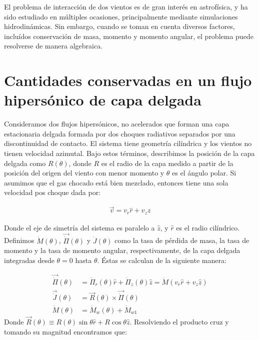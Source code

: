 \label{chap:hipersonica}

El problema de interacción de dos vientos es de gran interés en astrofísica, y
ha sido estudiado en múltiples ocasiones, principalmente mediante simulaciones
hidrodinámicas. Sin embargo, cuando se toman en cuenta diversos factores, incluídos
conservación de masa, momento y momento angular, el problema puede resolverse de manera
algebraica.
\section{Cantidades conservadas en un flujo hipersónico de capa delgada}

Consideramos dos flujos hipersónicos, no acelerados que forman una capa estacionaria delgada
formada por dos choques radiativos separados por una discontinuidad de contacto. El sistema
tiene geometría cilíndrica y los vientos no tienen velocidad azimutal. Bajo estos términos,
describimos la posición de la capa delgada como $R(\theta)$, donde $R$ es el radio de la capa
medido a partir de la posición del origen del viento con menor momento y $\theta$ es el ángulo
polar. Si asumimos que el gas chocado está bien mezclado, entonces tiene una sola velocidad
pos choque dada por:

\begin{align}
  \vec{v} = v_r \hat{r} + v_z \hat{z}
\end{align}

Donde el eje de simetría del sistema es paralelo a $\hat{z}$, y $\hat{r}$ es el radio cilíndrico.
Definimos $\dot{M}(\theta)$, $\vec{\dot{\Pi}}(\theta)$ y $\dot{J}(\theta)$ como la tasa de pérdida
de masa, la tasa de momento y la tasa de momento angular, respectivamente, de la capa delgada
integradas desde $\theta=0$ hasta $\theta$. Éstas se calculan de la siguiente manera:

\begin{align}
  \vec{\dot{\Pi}}(\theta) &= \dot{\Pi}_r(\theta) \hat{r} + \dot{\Pi}_z(\theta) \hat{z} = \dot{M}\left(
                      v_r \hat{r} + v_z\hat{z}\right) \label{eq:dot-pi}\\
  \vec{\dot{J}}(\theta) &= \vec{R}(\theta) \times \vec{\dot{\Pi}}(\theta)  \\
  \dot{M}(\theta) &= \dot{M}_w(\theta) + \dot{M}_{w1} \label{eq:dot-M}
\end{align}
Donde $\vec{R}(\theta)\equiv R(\theta)\sin\theta \hat{r} + R\cos\theta \hat{z}$. Resolviendo el producto
cruz y tomando su magnitud encontramos que:

